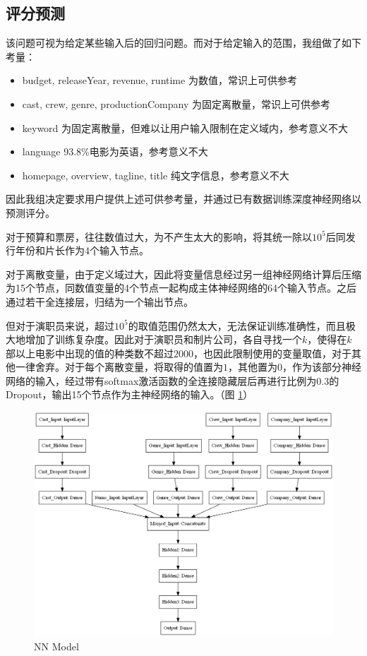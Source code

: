 \documentclass[UTF8]{ctexart}
\begin{document}
\subsection{评分预测}
\par 该问题可视为给定某些输入后的回归问题。而对于给定输入的范围，我组做了如下考量：
\begin{itemize}
  \item{budget, releaseYear, revenue, runtime} 为数值，常识上可供参考
  \item{cast, crew, genre, productionCompany} 为固定离散量，常识上可供参考
  \item{keyword} 为固定离散量，但难以让用户输入限制在定义域内，参考意义不大
  \item{language} 93.8\%电影为英语，参考意义不大
  \item{homepage, overview, tagline, title} 纯文字信息，参考意义不大
\end{itemize}
\par 因此我组决定要求用户提供上述可供参考量，并通过已有数据训练深度神经网络以预测评分。
\par 对于预算和票房，往往数值过大，为不产生太大的影响，将其统一除以$10^5$后同发行年份和片长作为4个输入节点。
\par 对于离散变量，由于定义域过大，因此将变量信息经过另一组神经网络计算后压缩为15个节点，同数值变量的4个节点一起构成主体神经网络的64个输入节点。之后通过若干全连接层，归结为一个输出节点。
\par 但对于演职员来说，超过$10^5$的取值范围仍然太大，无法保证训练准确性，而且极大地增加了训练复杂度。因此对于演职员和制片公司，各自寻找一个$k$，使得在$k$部以上电影中出现的值的种类数不超过$2000$，也因此限制使用的变量取值，对于其他一律舍弃。对于每个离散变量，将取得的值置为$1$，其他置为$0$，作为该部分神经网络的输入，经过带有softmax激活函数的全连接隐藏层后再进行比例为0.3的Dropout，输出15个节点作为主神经网络的输入。（图 \ref{fig:model}）
\newpage
\begin{figure}[ht]
  \centering
  \includegraphics[scale=.4]{model.png}
  \caption{NN Model}
  \label{fig:model}
\end{figure}
\end{document}
